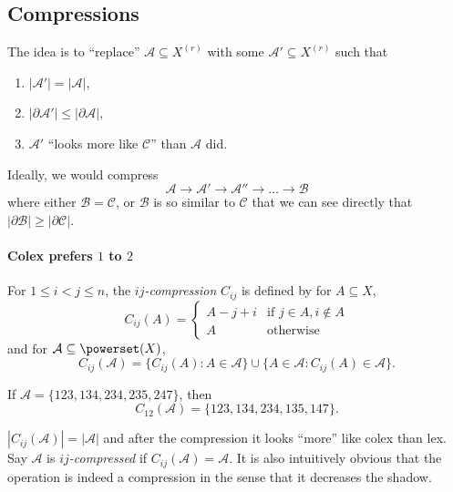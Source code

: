 \documentclass[a4paper]{article}
\newcommand{\shadow}{\partial}
\begin{document}
\subsection{Compressions}

The idea is to ``replace'' \(\mathcal A \subseteq X^{(r)}\) with some \(\mathcal A' \subseteq X^{(r)}\) such that
\begin{enumerate}
\item \(|\mathcal A'| = |\mathcal A|\),
\item \(|\shadow \mathcal A'| \leq |\shadow \mathcal A|\),
\item \(\mathcal A'\) ``looks more like \(\mathcal C\)'' than \(\mathcal A\) did.
\end{enumerate}

Ideally, we would compress
\[
  \mathcal A \to \mathcal A' \to \mathcal A'' \to \dots \to \mathcal B
\]
where either \(\mathcal B = \mathcal C\), or \(\mathcal B\) is so similar to \(\mathcal C\) that we can see directly that \(|\shadow \mathcal B| \geq |\shadow \mathcal C|\).

\paragraph{Colex prefers \(1\) to \(2\)}

\begin{definition}[\(ij\)-compression]
  For \(1 \leq i < j \leq n\), the \emph{\(ij\)-compression} \(C_{ij}\) is defined by for \(A \subseteq X\),
  \[
    C_{ij} (A) =
    \begin{cases}
      A - j + i & \text{if } j \in A, i \notin A \\
      A & \text{otherwise}
    \end{cases}
  \]
  and for \(\mathcal A \subseteq \powerset(X)\),
  \[
    C_{ij} (\mathcal A) = \{C_{ij}(A): A \in \mathcal A\} \cup \{A \in \mathcal A: C_{ij}(A) \in \mathcal A\}.
  \]
\end{definition}

\begin{eg}
  If \(\mathcal A = \{123, 134, 234, 235, 247\}\), then
  \[
    C_{12}(\mathcal A) = \{123, 134, 234, 135, 147\}.
  \]
\end{eg}

\(|C_{ij}(\mathcal A)| = |\mathcal A|\) and after the compression it looks ``more'' like colex than lex. Say \(\mathcal A\) is \emph{\(ij\)-compressed} if \(C_{ij}(\mathcal A) = \mathcal A\). It is also intuitively obvious that the operation is indeed a compression in the sense that it decreases the shadow.
\end{document}
